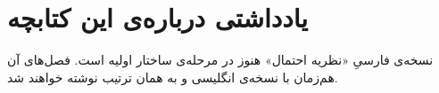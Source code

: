 \chapter*{یادداشتی درباره‌ی این کتابچه}

نسخه‌ی فارسیِ «نظریه احتمال» هنوز در مرحله‌ی ساختار اولیه است. فصل‌های آن هم‌زمان با نسخه‌ی انگلیسی و به همان ترتیب نوشته خواهند شد.
